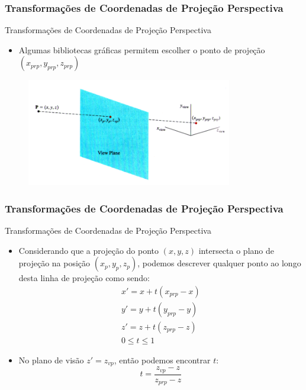 \documentclass{beamer}
\begin{document}
\begin{frame}
\frametitle{Transformações de Coordenadas de Projeção Perspectiva}
	\begin{block}{Transformações de Coordenadas de Projeção Perspectiva}
		\begin{itemize}
			\item Algumas bibliotecas gráficas permitem escolher o ponto de projeção $(x_{prp},y_{prp},z_{prp})$
		\end{itemize}
	\end{block}
	
	\begin{figure}[!h]
			\begin{center}
			\includegraphics[width=0.8\textwidth]{Figures/PonPro2}
			\end{center}
	\end{figure}
\end{frame}


\begin{frame}
\frametitle{Transformações de Coordenadas de Projeção Perspectiva}
	\begin{block}{Transformações de Coordenadas de Projeção Perspectiva}
		\begin{itemize}
			\item Considerando que a projeção do ponto $(x,y,z)$ intersecta o plano de projeção na posição $(x_p,y_p,z_p)$, podemos descrever qualquer ponto ao longo desta linha de projeção como sendo:
			\begin{eqnarray*}
				x' = x +t(x_{prp}-x) \\
				y' = y +t(y_{prp}-y) \\
				z' = z +t(z_{prp}-z) \\
				0 \leq t \leq 1
			\end{eqnarray*}
		
		\item No plano de visão $z' = z_{vp}$, então podemos encontrar $t$:
		\begin{equation*}
			t = \frac{z_{vp} - z}{z_{prp}-z}
		\end{equation*}
		\end{itemize}	
	\end{block}
\end{frame}
\end{document}
